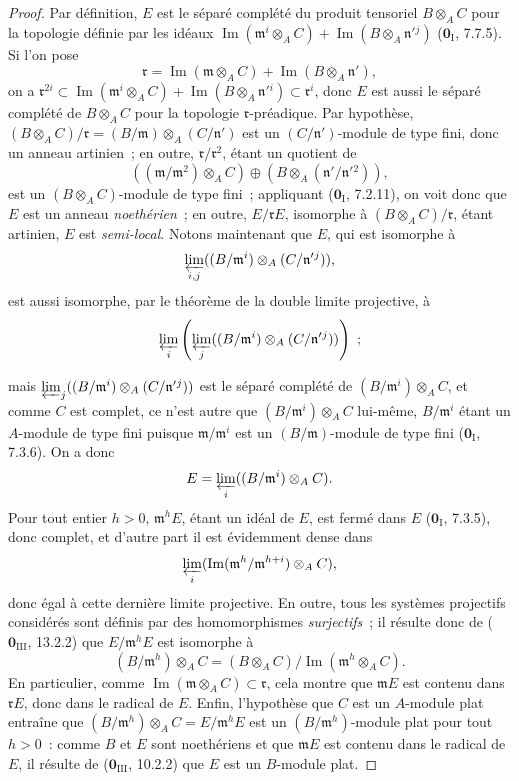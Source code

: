 \begin{proof}
Par définition, $E$ est le séparé complété du produit tensoriel $B\otimes_A C$
pour la topologie définie par les idéaux
$\operatorname{Im}(\mathfrak m^i\otimes_A C)+
\operatorname{Im}(B\otimes_A\mathfrak n'{}^j)$
($\mathbf 0_{\mathrm I}$, 7.7.5). Si l'on pose
\[
  \mathfrak r=\operatorname{Im}(\mathfrak m\otimes_A C)+
  \operatorname{Im}(B\otimes_A\mathfrak n'),
\]
on a
$\mathfrak r^{2i}\subset
\operatorname{Im}(\mathfrak m^i\otimes_A C)+
\operatorname{Im}(B\otimes_A\mathfrak n'{}^i)\subset\mathfrak r^i$, donc $E$
est aussi le séparé complété de $B\otimes_A C$ pour la topologie
$\mathfrak r$-préadique. Par hypothèse,
$(B\otimes_A C)/\mathfrak r=(B/\mathfrak m)\otimes_A(C/\mathfrak n')$ est un
$(C/\mathfrak n')$-module de type fini, donc un anneau artinien~; en outre,
$\mathfrak r/\mathfrak r^2$, étant un quotient de
\[
  ((\mathfrak m/\mathfrak m^2)\otimes_A C)
  \oplus(B\otimes_A(\mathfrak n'/\mathfrak n'{}^2)),
\]
est un $(B\otimes_A C)$-module de type fini~; appliquant
($\mathbf 0_{\mathrm I}$, 7.2.11), on voit donc que $E$ est un anneau
\emph{noethérien}~; en outre, $E/\mathfrak rE$, isomorphe à
$(B\otimes_A C)/\mathfrak r$, étant artinien, $E$ est \emph{semi-local}.
Notons maintenant que $E$, qui est isomorphe à
\[
  \varprojlim_{i,j}((B/\mathfrak m^i)\otimes_A(C/\mathfrak n'{}^j)),
\]
est aussi isomorphe, par le théorème de la double limite projective, à
\[
  \varprojlim_i\left(\varprojlim_j
  ((B/\mathfrak m^i)\otimes_A(C/\mathfrak n'{}^j))\right)~;
\]


mais $\varprojlim_j((B/\mathfrak m^i)\otimes_A(C/\mathfrak n'{}^j))$ est le
séparé complété de $(B/\mathfrak m^i)\otimes_A C$, et comme $C$ est complet,
ce n'est autre que $(B/\mathfrak m^i)\otimes_A C$ lui-même,
$B/\mathfrak m^i$ étant un $A$-module de type fini puisque
$\mathfrak m/\mathfrak m^i$ est un $(B/\mathfrak m)$-module de type fini
($\mathbf 0_{\mathrm I}$, 7.3.6). On a donc
\[
  E=\varprojlim_i((B/\mathfrak m^i)\otimes_A C).
\]
Pour tout entier $h>0$, $\mathfrak m^hE$, étant un idéal de $E$, est fermé
dans $E$ ($\mathbf 0_{\mathrm I}$, 7.3.5), donc complet, et d'autre part il est
évidemment dense dans
\[
  \varprojlim_i
  (\operatorname{Im}(\mathfrak m^h/\mathfrak m^{h+i})\otimes_A C),
\]
donc égal à cette dernière limite projective. En outre, tous les systèmes
projectifs considérés sont définis par des homomorphismes \emph{surjectifs}~;
il résulte donc de ($\mathbf 0_{\mathrm{III}}$, 13.2.2) que
$E/\mathfrak m^hE$ est isomorphe à
\[
  (B/\mathfrak m^h)\otimes_A C
  =(B\otimes_A C)/\operatorname{Im}(\mathfrak m^h\otimes_A C).
\]
En particulier, comme
$\operatorname{Im}(\mathfrak m\otimes_A C)\subset\mathfrak r$, cela montre
que $\mathfrak mE$ est contenu dans $\mathfrak rE$, donc dans le radical de
$E$. Enfin, l'hypothèse que $C$ est un $A$-module plat entraîne que
$(B/\mathfrak m^h)\otimes_A C=E/\mathfrak m^hE$ est un
$(B/\mathfrak m^h)$-module plat pour tout $h>0$~: comme $B$ et $E$ sont
noethériens et que $\mathfrak mE$ est contenu dans le radical de $E$, il
résulte de ($\mathbf 0_{\mathrm{III}}$, 10.2.2) que $E$ est un $B$-module
plat.
\end{proof}

